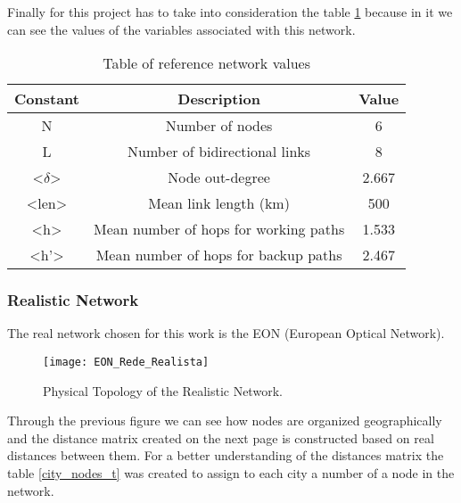 Finally for this project has to take into consideration the table \ref{table:3} because in it we can see the values of the variables associated with this network.
\begin{table}[h!]
\centering
\begin{tabular}{|| c | c | c||}
 \hline
 Constant & Description & Value \\
 \hline\hline
 N & Number of nodes & 6 \\
 L & Number of bidirectional links & 8 \\
 <$\delta$> & Node out-degree & 2.667 \\
 <len> & Mean link length (km) & 500 \\
 <h> & Mean number of hops for working paths & 1.533 \\
 <h'> & Mean number of hops for backup paths & 2.467 \\
 \hline
\end{tabular}
\caption{Table of reference network values}
\label{table:3}
\end{table}


\subsubsection{Realistic Network}
The real network chosen for this work is the EON (European Optical Network).

\begin{figure}[h!]
\centering
\texttt{[image: EON\_Rede\_Realista]}
\caption{Physical Topology of the Realistic Network.}
\end{figure}

Through the previous figure we can see how nodes are organized geographically and the distance matrix created on the next page is constructed based on real distances between them.
For a better understanding of the distances matrix the table \ref{city_nodes_t} was created to assign to each city a number of a node in the network.

